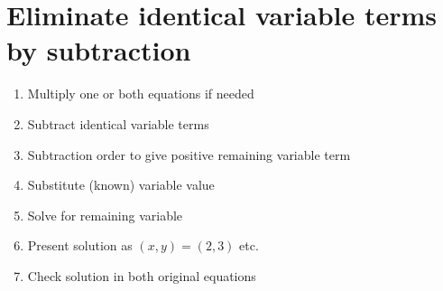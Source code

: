 \documentclass[12pt, a4paper, addpoints]{exam}
\begin{document}
\section*{Eliminate  identical variable terms by subtraction}

\begin{mdframed}[backgroundcolor=gray!20, roundcorner=5pt] %
\begin{multicols}{2}
\begin{enumerate}
    \item Multiply one or both equations if needed
    \item Subtract identical variable terms 
    \item Subtraction order to give positive remaining variable term
\item Substitute (known) variable value
    \item Solve for  remaining variable 
    \item Present solution as  \((x, y) = (2, 3)\) etc.
    \item Check  solution in both original equations
\end{enumerate}
\end{multicols}
\end{mdframed}
\end{document}

